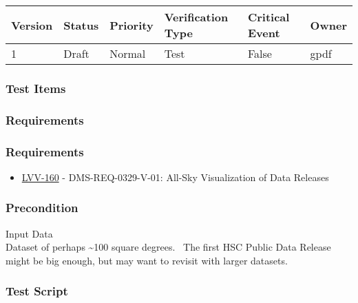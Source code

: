 \begin{longtable}[]{@{}llllll@{}}
\toprule
Version & Status & Priority & Verification Type & Critical Event &
Owner\tabularnewline
\midrule
\endhead
1 & Draft & Normal & Test & False & gpdf\tabularnewline
\bottomrule
\end{longtable}

\hypertarget{test-items-1}{%
\subsubsection{Test Items}\label{test-items-1}}

\hypertarget{requirements-2}{%
\subsubsection{Requirements}\label{requirements-2}}

\hypertarget{requirements-3}{%
\subsubsection{Requirements}\label{requirements-3}}

\begin{itemize}
\tightlist
\item
  \href{https://jira.lsstcorp.org/browse/LVV-160}{LVV-160} -
  DMS-REQ-0329-V-01: All-Sky Visualization of Data Releases
\end{itemize}

\hypertarget{precondition}{%
\subsubsection{Precondition}\label{precondition}}

Input Data\\
Dataset of perhaps \textasciitilde{}100 square degrees. ~The first HSC
Public Data Release might be big enough, but may want to revisit with
larger datasets.

\hypertarget{test-script-1}{%
\subsubsection{Test Script}\label{test-script-1}}

